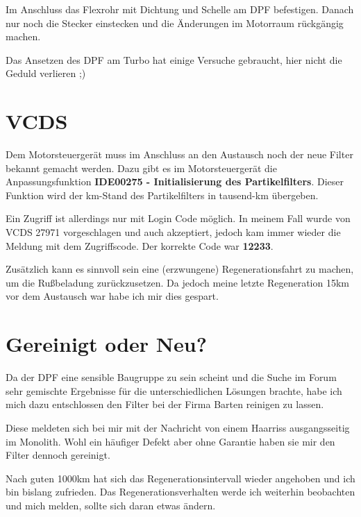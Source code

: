 \documentclass[twoside,a4paper]{refart}
\begin{document}
Im Anschluss das Flexrohr mit Dichtung und Schelle am DPF befestigen.
Danach nur noch die Stecker einstecken und die Änderungen im Motorraum rückgängig machen.

 Das Ansetzen des DPF am Turbo hat einige Versuche gebraucht, hier nicht die Geduld verlieren ;)
\section{VCDS}
Dem Motorsteuergerät muss im Anschluss an den Austausch noch der neue Filter bekannt gemacht werden. Dazu gibt es im Motorsteuergerät die Anpassungsfunktion \textbf{IDE00275 - Initialisierung des Partikelfilters}. Dieser Funktion wird der km-Stand des Partikelfilters in tausend-km übergeben. 

Ein Zugriff ist allerdings nur mit Login Code möglich.
In meinem Fall wurde von VCDS 27971 vorgeschlagen und auch akzeptiert, jedoch kam immer wieder die Meldung mit dem Zugriffscode. Der korrekte Code war \textbf{12233}.

Zusätzlich kann es sinnvoll sein eine (erzwungene) Regenerationsfahrt zu machen, um die Rußbeladung zurückzusetzen. Da jedoch meine letzte Regeneration 15km vor dem Austausch war habe ich mir dies gespart.

\section{Gereinigt oder Neu?}
Da der DPF eine sensible Baugruppe zu sein scheint und die Suche im Forum sehr gemischte Ergebnisse für die unterschiedlichen Lösungen brachte, habe ich mich dazu entschlossen den Filter bei der Firma Barten reinigen zu lassen.

Diese meldeten sich bei mir mit der Nachricht von einem Haarriss ausgangsseitig im Monolith. Wohl ein häufiger Defekt aber ohne Garantie haben sie mir den Filter dennoch gereinigt.

Nach guten 1000km hat sich das Regenerationsintervall wieder angehoben und ich bin bislang zufrieden. Das Regenerationsverhalten werde ich weiterhin beobachten und mich melden, sollte sich daran etwas ändern.


\printindex
\end{document}
